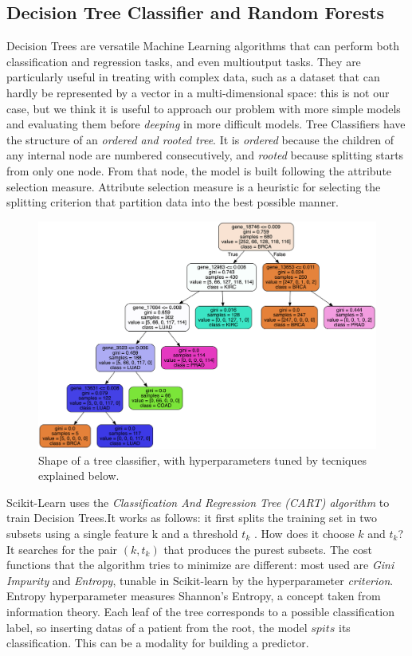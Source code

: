 \documentclass{article}
\begin{document}

\subsection{Decision Tree Classifier and Random Forests}

Decision Trees are versatile Machine Learning algorithms that can perform both classification and regression tasks, and even multioutput tasks. They are particularly useful in treating with complex data, such as a dataset that can hardly be represented by a vector in a multi-dimensional space: this is not our case, but we think it is useful to approach our problem with more simple models and evaluating them before \textit{deeping} in more difficult models.
Tree Classifiers have the structure of an \textit{ordered and rooted tree}. It is \textit{ordered} because the children of any internal node are numbered consecutively, and \textit{rooted} because splitting starts from only one node.
From that node, the model is built following the attribute selection measure.
Attribute selection measure is a heuristic for selecting the splitting criterion that partition data into the best possible manner.

\begin{figure}[h!]
\centering
\includegraphics[width=\linewidth]{img/tree_best.png}
\caption{Shape of a tree classifier, with hyperparameters tuned by tecniques explained below.}
\label{fig1}
\end{figure}


Scikit-Learn uses the \textit{Classification And Regression Tree (CART) algorithm} to train Decision Trees.It works as follows: it first splits the training set in two subsets using a single feature k and a threshold $t_k$ . How does it choose $k$ and $t_k$? It searches for the pair $(k, t_k)$ that produces the purest subsets. The cost functions that the algorithm tries to minimize are different: most used are \textit{Gini Impurity} and \textit{Entropy}, tunable in Scikit-learn by the hyperparameter \textit{criterion}. Entropy hyperparameter measures Shannon's Entropy, a concept taken from information theory.
Each leaf of the tree corresponds to a possible classification label, so inserting datas of a patient from the root, the model $spits$ its classification. This can be a modality for building a predictor.
\end{document}
